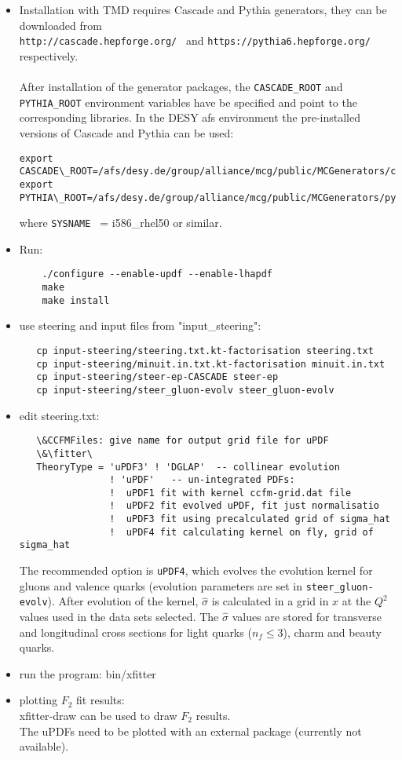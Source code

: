 \begin{itemize}

\item Installation with TMD requires Cascade and Pythia generators, 
they can be downloaded from\\
{\tt http://cascade.hepforge.org/ } and 
{\tt https://pythia6.hepforge.org/ } respectively. \\
        \\
After installation of the generator packages, the {\tt CASCADE\_ROOT}  and {\tt PYTHIA\_ROOT} 
environment variables have be specified and point to the corresponding libraries. 
In the DESY afs environment the pre-installed versions of Cascade and Pythia can be used:  
%
{\footnotesize\begin{verbatim}
export CASCADE\_ROOT=/afs/desy.de/group/alliance/mcg/public/MCGenerators/cascade/2.2.04/\$SYSNAME 
export PYTHIA\_ROOT=/afs/desy.de/group/alliance/mcg/public/MCGenerators/pythia6/425/\$SYSNAME}
\end{verbatim} }
\normalsize
where {\tt SYSNAME } = i586\_rhel50 or similar.

\item Run:
\begin{verbatim}
    ./configure --enable-updf --enable-lhapdf
    make 
    make install
\end{verbatim}


\item use steering and \minuit input files from "input\_steering": 

   \begin{verbatim} 
   cp input-steering/steering.txt.kt-factorisation steering.txt 
   cp input-steering/minuit.in.txt.kt-factorisation minuit.in.txt 
   cp input-steering/steer-ep-CASCADE steer-ep 
   cp input-steering/steer_gluon-evolv steer_gluon-evolv
    \end{verbatim}

\item  edit steering.txt: 
   \begin{verbatim}
   \&CCFMFiles: give name for output grid file for uPDF   
   \&\fitter\ 
   TheoryType = 'uPDF3' ! 'DGLAP'  -- collinear evolution
                ! 'uPDF'   -- un-integrated PDFs:
                !  uPDF1 fit with kernel ccfm-grid.dat file
                !  uPDF2 fit evolved uPDF, fit just normalisatio
                !  uPDF3 fit using precalculated grid of sigma_hat
                !  uPDF4 fit calculating kernel on fly, grid of sigma_hat
  \end{verbatim}
  The recommended option is \verb+uPDF4+, which evolves the evolution kernel for gluons and valence quarks
  (evolution parameters are set in \verb+steer_gluon-evolv+). After evolution of the kernel, $\hat {\sigma}$ is
  calculated in a grid in $x$ at the  $Q^2$ values used in the data sets selected. The ${\hat \sigma}$ values are   
  stored for transverse and longitudinal cross sections for light quarks ($n_f \leq 3$), charm and beauty quarks.
\item run the program: bin/xfitter 
   
\item plotting $F_2$ fit results: \\
xfitter-draw  can be used to draw $F_2$ results. \\
The uPDFs need to be plotted with an external package (currently not available).
\end{itemize}

